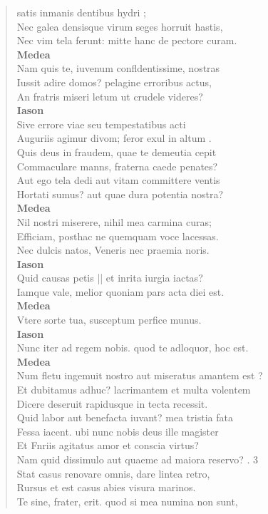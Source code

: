 \documentclass[11pt, a4paper]{report}
\begin{document}
\begin{verse}
{satis inmanis dentibus hydri \rbrack ; \\ Nec galea densisque virum seges horruit hastis, \\ Nec vim tela ferunt: mitte hanc de pectore curam. \\ \textbf{Medea} \\Nam quis te, iuvenum confldentissime, nostras \\ Iussit adire domos? pelagine erroribus actus, \\ An fratris miseri letum ut crudele videres? \\ \textbf{Iason} \\Sive errore viae seu tempestatibus acti \\  \lbrack Auguriis agimur divom; feror exul in altum \rbrack . \\ Quis deus in fraudem, quae  \lbrack te \rbrack  demeutia cepit \\ Commaculare manns, fraterna caede penates? \\ Aut ego tela dedi aut vitam committere ventis \\ Hortati sumus?  \lbrack aut quae dura potentia nostra? \\ \textbf{Medea} \\Nil nostri miserere, nihil mea carmina curas; \\ Efficiam, posthac ne quemquam voce lacessas. \\ Nec dulcis natos, Veneris nec praemia noris. \\ \textbf{Iason} \\Quid causas petis || et inrita iurgia iactas? \\ Iamque vale, melior quoniam pars acta diei est. \\ \textbf{Medea} \\Vtere sorte tua, susceptum perfice munus. \\ \textbf{Iason} \\Nunc iter ad regem nobis. quod te adloquor, hoc est. \\ \textbf{Medea} \\Num fletu ingemuit nostro aut miseratus amantem  \lbrack est \rbrack  ? \\ Et dubitamus adhuc? lacrimantem et multa volentem \\ Dicere deseruit rapidusque in tecta recessit. \\ Quid labor aut benefacta iuvant? mea tristia fata \\ Fessa iacent. ubi nunc nobis deus ille magister \\ Et Fnriis agitatus amor et conscia virtus? \\ Nam quid dissimulo aut quaeme ad maiora reservo? . 3 \\ Stat casus renovare omnis, dare lintea retro, \\ Rursus et  \lbrack est \rbrack  casus abies visura marinos. \\ Te sine, frater, erit. quod si mea numina non sunt, \\ }
\end{verse}
\end{document}
